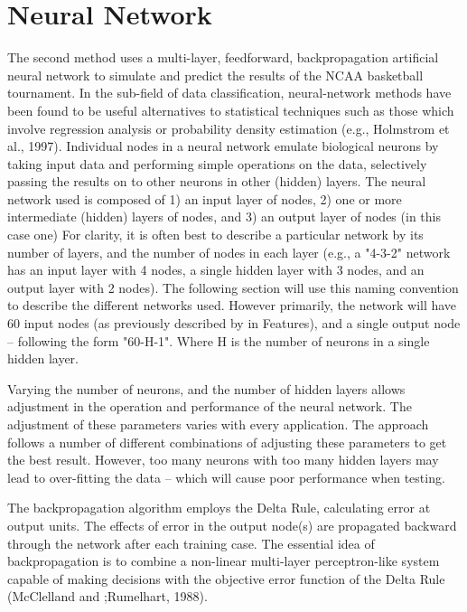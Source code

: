 \documentclass[conference]{IEEEtran}
\begin{document}



\section{Neural Network}
The second method uses a multi-layer, feedforward, backpropagation artificial neural network to simulate and predict the results of the NCAA basketball tournament.
In the sub-field of data classification, neural-network methods have been found to be useful alternatives to statistical techniques such as those which involve regression analysis or probability density estimation (e.g., Holmstrom et al., 1997).
Individual nodes in a neural network emulate biological neurons by taking input data and performing simple operations on the data, selectively passing the results on to other neurons in other (hidden) layers.
The neural network used is composed of 1) an input layer of nodes, 2) one or more intermediate (hidden) layers of nodes, and 3) an output layer of nodes (in this case one)
For clarity, it is often best to describe a particular network by its number of layers, and the number of nodes in each layer (e.g., a "4-3-2" network has an input layer with 4 nodes, a single hidden layer with 3 nodes, and an output layer with 2 nodes).
The following section will use this naming convention to describe the different networks used.
However primarily, the network will have 60 input nodes (as previously described by in Features), and a single output node -- following the form "60-H-1".
Where H is the number of neurons in a single hidden layer.

Varying the number of neurons, and the number of hidden layers allows adjustment in the operation and performance of the neural network.
The adjustment of these parameters varies with every application.
The approach follows a number of different combinations of adjusting these parameters to get the best result.
However, too many neurons with too many hidden layers may lead to over-fitting the data -- which will cause poor performance when testing.

The backpropagation algorithm employs the Delta Rule, calculating error at output units.
The effects of error in the output node(s) are propagated backward through the network after each training case.
The essential idea of backpropagation is to combine a non-linear multi-layer perceptron-like system capable of making decisions with the objective error function of the Delta Rule (McClelland and ;Rumelhart, 1988).
\end{document}
